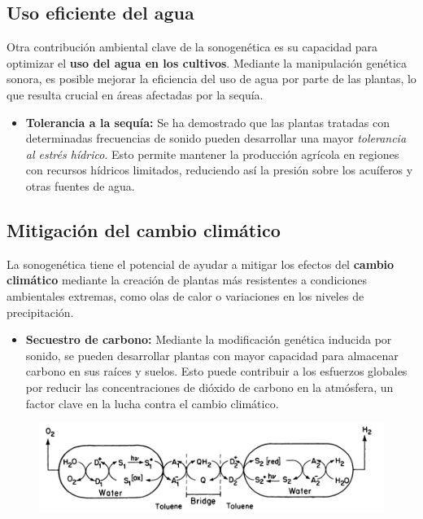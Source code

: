 \documentclass[twocolumn]{article}
\begin{document}
\subsection{Uso eficiente del agua}

Otra contribución ambiental clave de la sonogenética es su capacidad para optimizar el \textbf{uso del agua en los cultivos}. Mediante la manipulación genética sonora, es posible mejorar la eficiencia del uso de agua por parte de las plantas, lo que resulta crucial en áreas afectadas por la sequía.

\begin{itemize}
    \item \textbf{Tolerancia a la sequía:} Se ha demostrado que las plantas tratadas con determinadas frecuencias de sonido pueden desarrollar una mayor \textit{tolerancia al estrés hídrico}. Esto permite mantener la producción agrícola en regiones con recursos hídricos limitados, reduciendo así la presión sobre los acuíferos y otras fuentes de agua.
\end{itemize}

\subsection{Mitigación del cambio climático}

La sonogenética tiene el potencial de ayudar a mitigar los efectos del \textbf{cambio climático} mediante la creación de plantas más resistentes a condiciones ambientales extremas, como olas de calor o variaciones en los niveles de precipitación.

\begin{itemize}
    \item \textbf{Secuestro de carbono:} Mediante la modificación genética inducida por sonido, se pueden desarrollar plantas con mayor capacidad para almacenar carbono en sus raíces y suelos. Esto puede contribuir a los esfuerzos globales por reducir las concentraciones de dióxido de carbono en la atmósfera, un factor clave en la lucha contra el cambio climático.
\end{itemize}

\begin{figure}[!h]
    \centering
    \includegraphics[width=\linewidth]{imagenes/Captura desde 2024-09-25 22-45-27.png}       
\end{figure}
\end{document}
